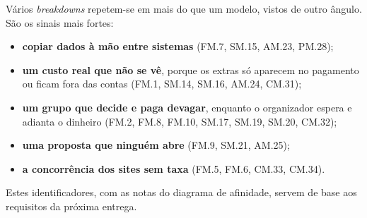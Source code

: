 Vários \textit{breakdowns} repetem-se em mais do que um modelo, vistos de outro ângulo. São os sinais mais fortes:
\begin{itemize}
  \item \textbf{copiar dados à mão entre sistemas} (FM.7, SM.15, AM.23, PM.28);
  \item \textbf{um custo real que não se vê}, porque os extras só aparecem no pagamento ou ficam fora das contas (FM.1, SM.14, SM.16, AM.24, CM.31);
  \item \textbf{um grupo que decide e paga devagar}, enquanto o organizador espera e adianta o dinheiro (FM.2, FM.8, FM.10, SM.17, SM.19, SM.20, CM.32);
  \item \textbf{uma proposta que ninguém abre} (FM.9, SM.21, AM.25);
  \item \textbf{a concorrência dos sites sem taxa} (FM.5, FM.6, CM.33, CM.34).
\end{itemize}
Estes identificadores, com as notas do diagrama de afinidade, servem de base aos requisitos da próxima entrega.

